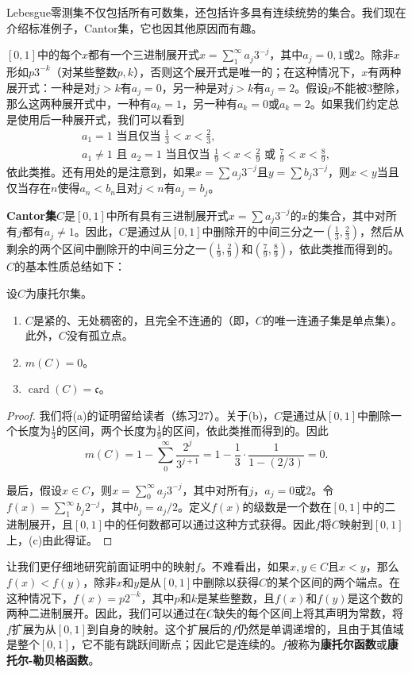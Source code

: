 \documentclass[lang=cn,10pt,thmcnt=section]{elegantbook}
\begin{document}
Lebesgue零测集不仅包括所有可数集，还包括许多具有连续统势的集合。我们现在介绍标准例子，Cantor集，它也因其他原因而有趣。

$[0, 1]$中的每个$x$都有一个三进制展开式$x = \sum_{1}^{\infty} a_j 3^{-j}$，其中$a_j = 0, 1$或$2$。除非$x$形如$p3^{-k}$（对某些整数$p, k$），否则这个展开式是唯一的；在这种情况下，$x$有两种展开式：一种是对$j > k$有$a_j = 0$，另一种是对$j > k$有$a_j = 2$。假设$p$不能被$3$整除，那么这两种展开式中，一种有$a_k = 1$，另一种有$a_k = 0$或$a_k = 2$。如果我们约定总是使用后一种展开式，我们可以看到
\begin{align}
a_1 = 1 \text{ 当且仅当 } \frac{1}{3} < x < \frac{2}{3},\\
a_1 \neq 1 \text{ 且 } a_2 = 1 \text{ 当且仅当 } \frac{1}{9} < x < \frac{2}{9} \text{ 或 } \frac{7}{9} < x < \frac{8}{9},
\end{align}
依此类推。还有用处的是注意到，如果$x = \sum a_j 3^{-j}$且$y = \sum b_j 3^{-j}$，则$x < y$当且仅当存在$n$使得$a_n < b_n$且对$j < n$有$a_j = b_j$。

\textbf{Cantor集}$C$是$[0, 1]$中所有具有三进制展开式$x = \sum a_j 3^{-j}$的$x$的集合，其中对所有$j$都有$a_j \neq 1$。因此，$C$是通过从$[0, 1]$中删除开的中间三分之一$(\frac{1}{3}, \frac{2}{3})$，然后从剩余的两个区间中删除开的中间三分之一$(\frac{1}{9}, \frac{2}{9})$和$(\frac{7}{9}, \frac{8}{9})$，依此类推而得到的。$C$的基本性质总结如下：


\begin{proposition}\label{proposition1.22}
设$C$为康托尔集。
\begin{enumerate}[label=\alph*.]
\item $C$是紧的、无处稠密的，且完全不连通的（即，$C$的唯一连通子集是单点集）。此外，$C$没有孤立点。
\item $m(C) = 0$。
\item $\operatorname{card}(C) = \mathfrak{c}$。
\end{enumerate}


\end{proposition}
\begin{proof}
	我们将(a)的证明留给读者（练习27）。关于(b)，$C$是通过从$[0,1]$中删除一个长度为$\frac{1}{3}$的区间，两个长度为$\frac{1}{9}$的区间，依此类推而得到的。因此
	\[
	m(C) = 1 - \sum_{0}^{\infty} \frac{2^j}{3^{j+1}} = 1 - \frac{1}{3} \cdot \frac{1}{1-(2/3)} = 0.
	\]
	
	最后，假设$x \in C$，则$x = \sum_{0}^{\infty} a_j3^{-j}$，其中对所有$j$，$a_j = 0$或$2$。令$f(x) = \sum_{1}^{\infty} b_j2^{-j}$，其中$b_j = a_j/2$。定义$f(x)$的级数是一个数在$[0,1]$中的二进制展开，且$[0,1]$中的任何数都可以通过这种方式获得。因此$f$将$C$映射到$[0,1]$上，(c)由此得证。
	\end{proof}
让我们更仔细地研究前面证明中的映射$f$。不难看出，如果$x, y \in C$且$x < y$，那么$f(x) < f(y)$，除非$x$和$y$是从$[0,1]$中删除以获得$C$的某个区间的两个端点。在这种情况下，$f(x) = p2^{-k}$，其中$p$和$k$是某些整数，且$f(x)$和$f(y)$是这个数的两种二进制展开。因此，我们可以通过在$C$缺失的每个区间上将其声明为常数，将$f$扩展为从$[0,1]$到自身的映射。这个扩展后的$f$仍然是单调递增的，且由于其值域是整个$[0,1]$，它不能有跳跃间断点；因此它是连续的。$f$被称为\textbf{康托尔函数}或\textbf{康托尔-勒贝格函数}。
\end{document}
